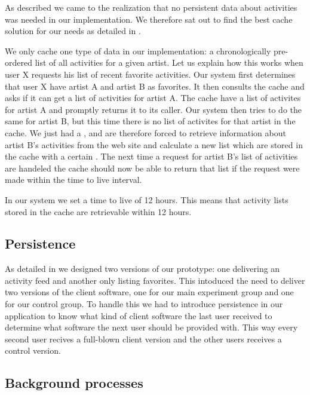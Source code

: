 As described we came to the realization that no persistent data
about activities was needed in our implementation.
We therefore sat out to find the best cache solution for our needs as detailed
in .

We only cache one type of data in our implementation:
a chronologically pre-ordered list of all activities for a given artist.
Let us explain how this works
when user X requests his list of recent favorite activities. Our system
first determines that user X have artist A and artist B as
favorites. It then consults the cache and asks if it can get a list of
activities for artist A. The cache have a list of activites for artist A and
promptly returns it to its caller. Our system then tries to do the same for
artist B, but this time there is no list of activites for that artist in the
cache. We just had a , and are therefore forced to retrieve
information about artist B's activities from the \urort{} web site and
calculate a new list which are stored in the cache with a certain
. The next time a request for artist B's list of activities
are handeled the cache should now be able to return that list if the request
were made within the time to live interval.

In our system we set a time to live of 12 hours. This means that activity
lists stored in the cache are retrievable within 12 hours.

\subsection{Persistence}

As detailed in
we designed two versions of our prototype: one delivering an activity
feed and another only listing favorites. This intoduced the need to deliver
two versions of the client software, one for our main experiment group and one
for our control group. To handle this we had to introduce persistence in our
application to know what kind of client software the last user received to
determine what software the next user should be provided with. This way every
second user recives a full-blown client version and the other users receives a
control version.

\subsection{Background processes}
\label{section:implementation.architecture.background.process}

